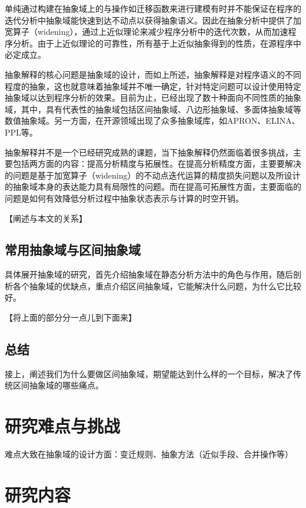  单纯通过构建在抽象域上的与操作如迁移函数来进行建模有时并不能保证在程序的迭代分析中抽象域能快速到达不动点以获得抽象语义。因此在抽象分析中提供了加宽算子（widening），通过上近似理论来减少程序分析中的迭代次数，从而加速程序分析。由于上近似理论的可靠性，所有基于上近似抽象得到的性质，在源程序中必定成立。
 
 抽象解释的核心问题是抽象域的设计，而如上所述，抽象解释是对程序语义的不同程度的抽象，这也就意味着抽象域并不唯一确定，针对特定问题可以设计使用特定抽象域以达到程序分析的效果。目前为止，已经出现了数十种面向不同性质的抽象域，其中，具有代表性的抽象域包括区间抽象域、八边形抽象域、多面体抽象域等数值抽象域\cite{张健2019程序分析研究进展}。另一方面，在开源领域出现了众多抽象域库，如APRON\cite{jeannet2009apron}、ELINA\cite{singh2017practical}、PPL\cite{bagnara2006parma}等。
 
 抽象解释并不是一个已经研究成熟的课题，当下抽象解释仍然面临着很多挑战，主要包括两方面的内容：提高分析精度与拓展性。在提高分析精度方面，主要要解决的问题是基于加宽算子（widening）的不动点迭代运算的精度损失问题以及所设计的抽象域本身的表达能力具有局限性的问题。而在提高可拓展性方面，主要面临的问题是如何有效降低分析过程中抽象状态表示与计算的时空开销。
 
 【阐述与本文的关系】
 
 \subsection{常用抽象域与区间抽象域}
 
 具体展开抽象域的研究，首先介绍抽象域在静态分析方法中的角色与作用，随后剖析各个抽象域的优缺点，重点介绍区间抽象域，它能解决什么问题，为什么它比较好。
 
 【将上面的部分分一点儿到下面来】
 
 \subsection{总结}
 
 接上，阐述我们为什么要做区间抽象域，期望能达到什么样的一个目标，解决了传统区间抽象域的哪些痛点。
 
 \section{研究难点与挑战}
 
 难点大致在抽象域的设计方面：变迁规则、抽象方法（近似手段、合并操作等）
 
 \section{研究内容}
 
